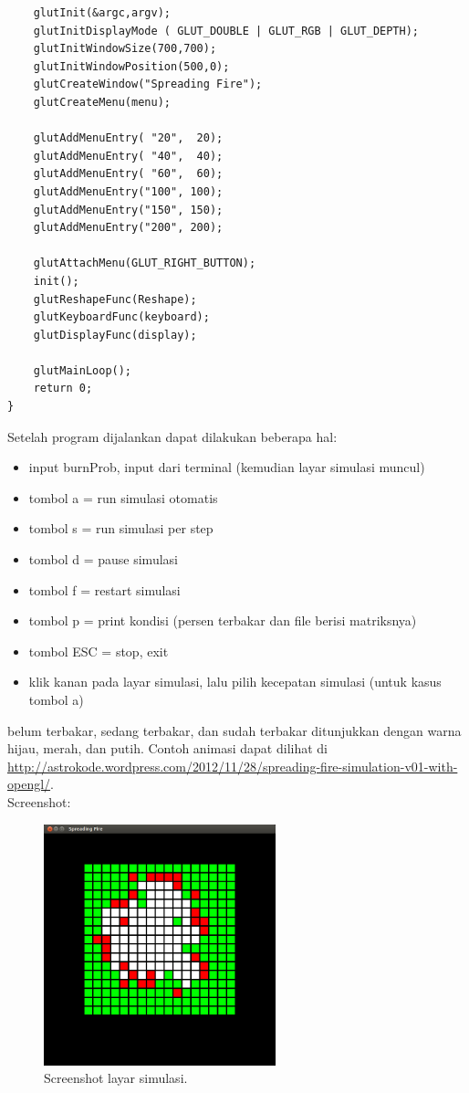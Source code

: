 \documentclass[paper=a4, fontsize=11pt]{scrartcl}
\numberwithin{equation}{section} %
\numberwithin{figure}{section} %
\numberwithin{table}{section} %
\begin{document}
\begin{lstlisting}
	glutInit(&argc,argv);
	glutInitDisplayMode ( GLUT_DOUBLE | GLUT_RGB | GLUT_DEPTH);
	glutInitWindowSize(700,700);
	glutInitWindowPosition(500,0);
	glutCreateWindow("Spreading Fire");
	glutCreateMenu(menu);

	glutAddMenuEntry( "20",  20);
	glutAddMenuEntry( "40",  40);
	glutAddMenuEntry( "60",  60);
	glutAddMenuEntry("100", 100);
	glutAddMenuEntry("150", 150);
	glutAddMenuEntry("200", 200);
	
	glutAttachMenu(GLUT_RIGHT_BUTTON);
	init();
	glutReshapeFunc(Reshape);
	glutKeyboardFunc(keyboard);
	glutDisplayFunc(display);
	
	glutMainLoop();
	return 0;
}
\end{lstlisting}

\newpage
Setelah program dijalankan dapat dilakukan beberapa hal:
\begin{itemize}
\item input burnProb, input dari terminal (kemudian layar simulasi muncul)
\item tombol a = run simulasi otomatis
\item tombol s = run simulasi per step
\item tombol d = pause simulasi
\item tombol f = restart simulasi
\item tombol p = print kondisi (persen terbakar dan file berisi matriksnya)
\item tombol ESC = stop, exit
\item klik kanan pada layar simulasi, lalu pilih kecepatan simulasi (untuk kasus tombol a)
\end{itemize}
belum terbakar, sedang terbakar, dan sudah terbakar ditunjukkan dengan warna hijau, merah, dan putih. Contoh animasi dapat dilihat di \url{http://astrokode.wordpress.com/2012/11/28/spreading-fire-simulation-v01-with-opengl/}.\\

Screenshot:
\begin{figure}
	\centering
	\includegraphics[width=0.6\textwidth]{spreadingFire.png}
	\caption{Screenshot layar simulasi.}
\end{figure}
\end{document}

